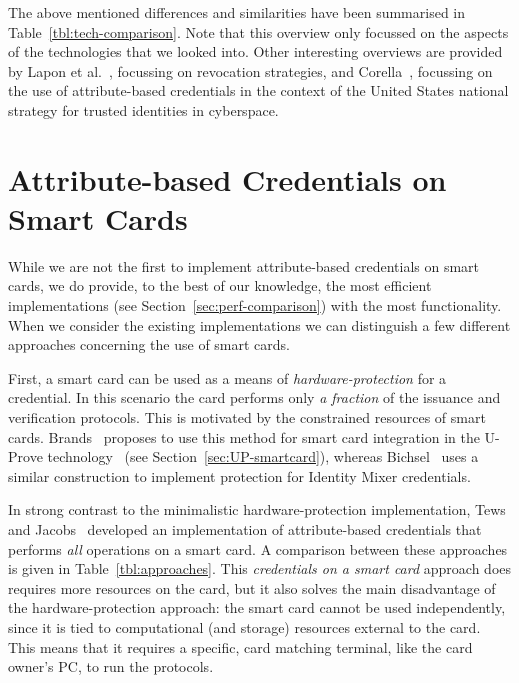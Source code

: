 The above mentioned differences and similarities have been summarised in
Table~\ref{tbl:tech-comparison}. Note that this overview only focussed on the
aspects of the technologies that we looked into. Other interesting overviews are
provided by Lapon et al.~\cite{LaponKDN2011,Lapon2012}, focussing on revocation
strategies, and Corella~\cite{Corella2011a,Corella2011b}, focussing on the use
of attribute-based credentials in the context of the United States national
strategy for trusted identities in cyberspace.

\section{Attribute-based Credentials on Smart Cards}

While we are not the first to implement attribute-based credentials on smart
cards, we do provide, to the best of our knowledge, the most efficient
implementations (see Section~\ref{sec:perf-comparison}) with the most
functionality. When we consider the existing implementations we can distinguish
a few different approaches concerning the use of smart cards.

First, a smart card can be used as a means of \emph{hardware-protection} for a
credential. In this scenario the card performs only \emph{a fraction} of the
issuance and verification protocols. This is motivated by the constrained
resources of smart cards. Brands~\cite[Chapter 6]{Brands2000} proposes to use
this method for smart card integration in the U-Prove
technology~\cite{U-Prove_Overview2011} (see Section~\ref{sec:UP-smartcard}),
whereas Bichsel~\cite{Bichsel2007} uses a similar construction to implement
protection for Identity Mixer credentials.

In strong contrast to the minimalistic hardware-protection implementation, Tews
and Jacobs~\cite{TewsJacobs09} developed an implementation of attribute-based
credentials that performs \emph{all} operations on a smart card. A comparison
between these approaches is given in Table~\ref{tbl:approaches}. This
\emph{credentials on a smart card} approach does requires more resources on the
card, but it also solves the main disadvantage of the hardware-protection
approach: the smart card cannot be used independently, since it is tied to
computational (and storage) resources external to the card. This means that it
requires a specific, card matching terminal, like the card owner's PC, to run
the protocols.

